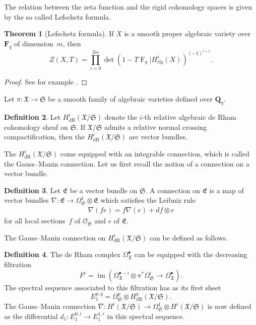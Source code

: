 \documentclass[a4paper,11pt]{article}
\numberwithin{equation}{section}
\newcommand{\QQ}{\mathbf{Q}} %
\newcommand{\FF}{\mathbf{F}} %
\DeclareMathOperator{\fIm}{im}       %
\DeclareMathOperator{\Frob}{F}           %
\providecommand{\HdR}{H_{\text{dR}}}    %
\providecommand{\Hrig}{H_{\text{rig}}}  %
\theoremstyle{definition}
\newtheorem{thm}{Theorem}[section]
\newtheorem{defn}[thm]{Definition}
\begin{document}
The relation between the zeta function and the rigid cohomology spaces 
is given by the so called Lefschetz formula.

\begin{thm}[Lefschetz formula] \label{thm:Lefschetz}
If $X$ is a smooth proper algebraic variety over $\FF_q$ of dimension~$m$, 
then 
\[
Z(X,T) = \prod_{i=0}^{2m} \det(1- T \Frob_q | \Hrig^i(X))^{(-1)^{i+1}}.
\]
\end{thm}

\begin{proof}
See for example \citep[Theorem 6.3]{EtesseLeStum1993}.
\end{proof}

Let $\pi:\mathfrak{X} \rightarrow \mathfrak{S}$ be a smooth family of algebraic varieties 
defined over $\QQ_q$.

\begin{defn}
Let $\HdR^i(\mathfrak{X}/\mathfrak{S})$ denote the $i$-th relative algebraic 
de Rham cohomology sheaf on $\mathfrak{S}$. 
If $\mathfrak{X}/\mathfrak{S}$ admits a relative normal crossing 
compactification, then the $\HdR^i(\mathfrak{X}/\mathfrak{S})$ are vector bundles.
\end{defn}

The $\HdR^i(\mathfrak{X}/\mathfrak{S})$ come equipped with an integrable 
connection, which is called the Gauss--Manin connection. Let us first recall 
the notion of a connection on a vector bundle.

\begin{defn}
Let $\mathfrak{E}$ be a vector bundle on $\mathfrak{S}$. A connection on 
$\mathfrak{E}$ is a map of vector bundles 
$\nabla \colon \mathfrak{E} \rightarrow \Omega^1_{\mathfrak{S}} \otimes \mathfrak{E}$
which satisfies the Leibniz rule
\begin{align*}
\nabla(f e)=f\nabla(e)+df \otimes e
\end{align*} 
for all local sections~$f$ of $\mathcal{O}_{\mathfrak{S}}$ and $e$ 
of $\mathfrak{E}$.
\end{defn}

The Gauss--Manin connection on $\HdR^i(\mathfrak{X}/\mathfrak{S})$ can 
be defined as follows.

\begin{defn}
The de Rham complex $\Omega^{\bullet}_{\mathfrak{X}}$ can be equipped 
with the decreasing filtration
\[
F^i=\fIm(\Omega^{\bullet-i}_{\mathfrak{X}} \otimes \pi^* \Omega^i_{\mathfrak{S}} \rightarrow \Omega^{\bullet}_{\mathfrak{X}}). 
\]
The spectral sequence associated to this filtration has as its first sheet 
\[
E_1^{p,q}=\Omega^p_{\mathfrak{S}} \otimes \HdR^q(\mathfrak{X}/\mathfrak{S}).
\]
The Gauss--Manin connection 
$\nabla:H^i(\mathfrak{X}/\mathfrak{S}) \rightarrow \Omega^1_{\mathfrak{S}} \otimes H^i(\mathfrak{X}/\mathfrak{S})$ 
is now defined as the differential $d_1 \colon E_1^{0,i} \rightarrow E_1^{1,i}$ 
in this spectral sequence.
\end{defn}
\end{document}

